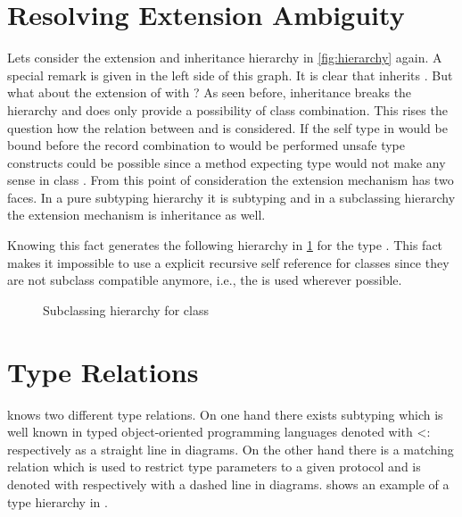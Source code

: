 \section{Resolving Extension Ambiguity}
\label{sec:resolveAmbiguity}
Lets consider the extension and inheritance hierarchy in \cref{fig:hierarchy}
again. A special remark is given in the left side of this graph. It is clear
that \E inherits \B. But what about the extension of \A 
with \B? As seen before, inheritance breaks the hierarchy and does only
provide a possibility of class combination. This rises the question how the 
relation between \A and \B is considered. If the self type in 
\A would be bound before the record combination to \E would be
performed unsafe type constructs could be possible since a method expecting 
type \A would not make any sense in class \E. From this point of 
consideration the extension mechanism has two faces. In a pure subtyping 
hierarchy it is subtyping and in a subclassing hierarchy the extension
mechanism is inheritance as well.


Knowing this fact generates the following hierarchy in \cref{fig:fixedHierarchy}
for the type \E. This fact makes it impossible to use a explicit recursive
self reference for classes since they are not subclass compatible anymore, i.e.,
the \mytype is used wherever possible. 

\begin{figure}[h]
	\centering
	\caption{Subclassing hierarchy for class \E}
	\label{fig:fixedHierarchy}
\end{figure}

\section{Type Relations}
\ooplss knows two different type relations. On one hand there exists
subtyping which is well known in typed object-oriented programming
languages denoted with <: respectively as a straight line in diagrams. On
the other hand there is a matching relation which is used to restrict type
parameters to a given protocol and is denoted with \match respectively
with a dashed line in diagrams.  shows an example
of a type hierarchy in \ooplss.

